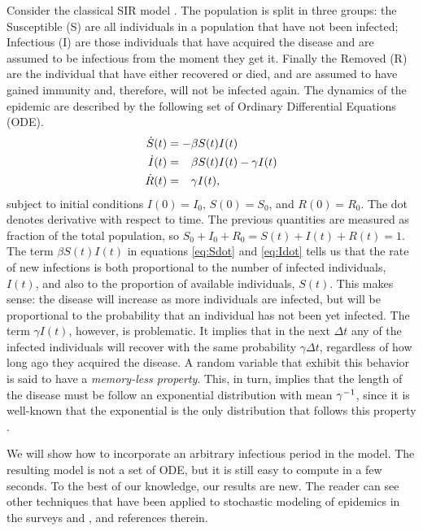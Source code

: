 \documentclass[USenglish,10pt]{article}
\newcommand{\gami}{\ensuremath\gamma^{-1}\xspace}
\newcommand{\phm}{\ensuremath\phantom{-}\xspace}
\begin{document}
Consider the classical SIR model \cite{kerm.mcke27,murr07,chas09}. The population is split in three groups: the Susceptible (S) are all individuals in a population that have not been infected; Infectious (I) are those individuals that have acquired the disease and are assumed to be infectious from the moment they get it. Finally the Removed (R) are the individual that have either recovered or died, and are assumed to have gained immunity and, therefore, will not be infected again.
The dynamics of the epidemic are described by the following set of Ordinary Differential Equations (ODE).
\begin{subequations}
	\begin{align}
		\dot{S}(t) &= -\beta S(t)I(t)  \label{eq:Sdot} \\
		\dot{I}(t) &= \phm\beta S(t)I(t) - \gamma I(t) \label{eq:Idot}  \\
		\dot{R}(t) &= \phm\gamma I(t), \label{eq:Rdot}
	\end{align}
\end{subequations}
subject to initial conditions $I(0)=I_0$, $S(0)=S_0$, and $R(0)=R_0$. The dot denotes derivative with respect to time. The previous quantities are measured as fraction of the total population, so $S_0+I_0+R_0=S(t)+I(t)+R(t)=1$.
The term $\beta S(t)I(t)$ in equations \eqref{eq:Sdot} and \eqref{eq:Idot} tells us that the rate of new infections is both proportional to the number of infected individuals, $I(t)$, and also to the proportion of available individuals, $S(t)$.
This makes sense: the disease will increase as more individuals are infected, but will be proportional to the probability that an individual has not been yet infected.
The term $\gamma I(t)$, however, is problematic. It implies that in the next $\Delta t$ any of the infected individuals will recover with the same probability $\gamma \Delta t$, regardless of how long ago they acquired the disease.
A random variable that exhibit this behavior is said to have a \emph{memory-less property}.
This, in turn, implies that the length of the disease must be follow an exponential distribution with mean $\gami$, since it is well-known that the exponential is the only distribution that follows this property \cite{kulk95}.

We will show how to incorporate an arbitrary infectious period in the model.
The resulting model is not a set of ODE, but it is still easy to compute in a few seconds.
To the best of our knowledge, our results are new.
The reader can see other techniques that have been applied to stochastic modeling of epidemics in the surveys \cite{lefe90} and \cite{dale.gani01}, and references therein.
\end{document}
